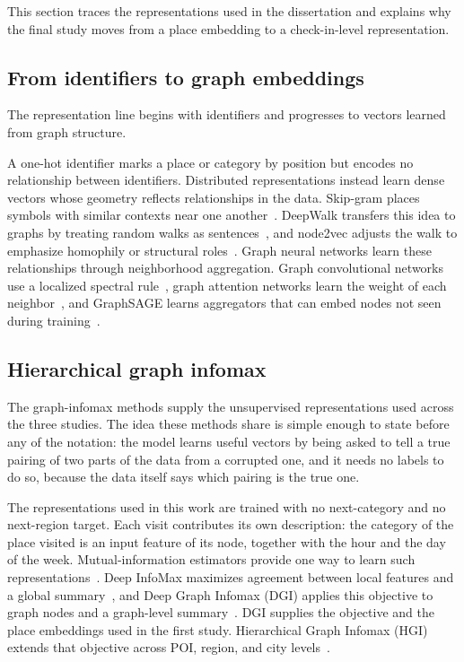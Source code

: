 This section traces the representations used in the dissertation and explains why the
final study moves from a place embedding to a check-in-level representation.

\subsection{From identifiers to graph embeddings}

The representation line begins with identifiers and progresses to vectors learned
from graph structure.


A one-hot identifier marks a place or category by position but encodes no relationship
between identifiers. Distributed representations instead learn dense vectors whose
geometry reflects relationships in the data. Skip-gram places symbols with similar
contexts near one another~\cite{mikolov2013word2vec}. DeepWalk transfers this idea to
graphs by treating random walks as sentences~\cite{perozzi2014deepwalk}, and node2vec
adjusts the walk to emphasize homophily or structural
roles~\cite{grover2016node2vec}. Graph neural networks learn these relationships
through neighborhood aggregation. Graph convolutional networks use a localized
spectral rule~\cite{kipf2017gcn}, graph attention networks learn the weight of each
neighbor~\cite{velivckovic2017graph}, and GraphSAGE learns aggregators that can embed
nodes not seen during training~\cite{hamilton2017graphsage}.

\subsection{Hierarchical graph infomax}

The graph-infomax methods supply the unsupervised representations used across the
three studies. The idea these methods share is simple enough to state before any of
the notation: the model learns useful vectors by being asked to tell a true pairing of
two parts of the data from a corrupted one, and it needs no labels to do so, because
the data itself says which pairing is the true one.

The representations used in this work are trained with no next-category and no
next-region target. Each visit contributes its own description: the category of
the place visited is an input feature of its node, together with the hour and the day
of the week.
Mutual-information estimators provide one way to learn such
representations~\cite{belghazi2018mine}. Deep InfoMax maximizes agreement between
local features and a global summary~\cite{hjelm2019dim}, and Deep Graph Infomax (DGI)
applies this objective to graph nodes and a graph-level
summary~\cite{velickovic2019deep}. DGI supplies the objective and the place embeddings
used in the first study. Hierarchical Graph Infomax (HGI) extends that objective
across POI, region, and city levels~\cite{huang2023hgi}.

